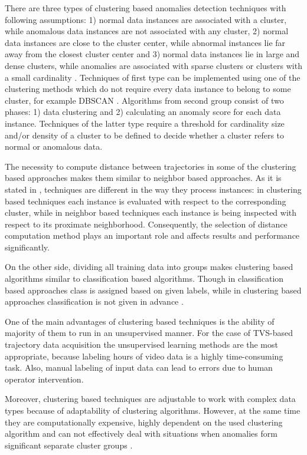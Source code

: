 There are three types of clustering based anomalies detection techniques with following assumptions: 1) normal data instances are associated with a cluster, while anomalous data instances are not associated with any cluster, 2) normal data instances are close to the cluster center, while abnormal instances lie far away from the closest cluster center and 3) normal data instances lie in large and dense clusters, while anomalies are associated with sparse clusters or clusters with a small cardinality \cite{article:15_survey_ad}\cite{article:6_survey_anom_det_rtuvs}. Techniques of first type can be implemented using one of the clustering methods which do not require every data instance to belong to some cluster, for example DBSCAN \cite{inproceedings:20_dbscan}. Algorithms from second group consist of two phases: 1) data clustering and 2) calculating an anomaly score for each data instance. Techniques of the latter type require a threshold for cardinality size and/or density of a cluster to be defined to decide whether a cluster refers to normal or anomalous data.

The necessity to compute distance between trajectories in some of the clustering based approaches makes them similar to neighbor based approaches. As it is stated in \cite{article:15_survey_ad}, techniques are different in the way they process instances: in clustering based techniques each instance is evaluated with respect to the corresponding cluster, while in neighbor based techniques each instance is being inspected with respect to its proximate neighborhood. Consequently, the selection of distance computation method plays an important role and affects results and performance significantly.

On the other side, dividing all training data into groups makes clustering based algorithms similar to classification based algorithms. Though in classification based approaches class is assigned based on given labels, while in clustering based approaches classification is not given in advance \cite{inproceedings:18_ardod_lstd}.

One of the main advantages of clustering based techniques is the ability of majority of them to run in an unsupervised manner. For the case of TVS-based trajectory data acquisition the unsupervised learning methods are the most appropriate, because labeling hours of video data is a highly time-consuming task. Also, manual labeling of input data can lead to errors due to human operator intervention.

Moreover, clustering based techniques are adjustable to work with complex data types because of adaptability of clustering algorithms. However, at the same time they are computationally expensive, highly dependent on the used clustering algorithm and can not effectively deal with situations when anomalies form significant separate cluster groups \cite{article:15_survey_ad}.

